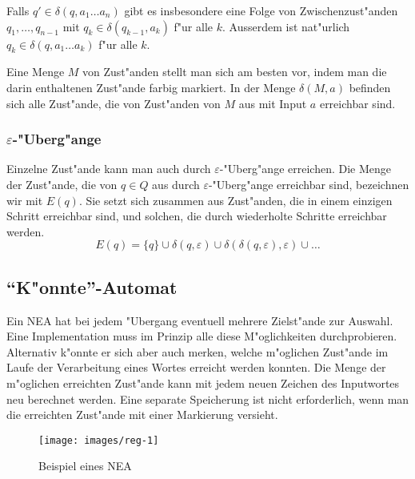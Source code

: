 Falls $q'\in\delta(q,a_1\dots a_n)$ gibt
es insbesondere eine Folge von Zwischenzust"anden $q_1,\dots,q_{n-1}$
mit $q_k\in\delta(q_{k-1},a_k)$ f"ur alle $k$. Ausserdem  ist
nat"urlich $q_k\in\delta(q,a_1\dots a_k)$ f"ur alle $k$.

Eine Menge $M$ von Zust"anden stellt man sich am besten vor, indem man die
darin enthaltenen Zust"ande farbig markiert. In der Menge $\delta(M,a)$
befinden sich alle Zust"ande, die von Zust"anden von $M$ aus mit Input
$a$ erreichbar sind.

\subsubsection{$\varepsilon$-"Uberg"ange}

Einzelne Zust"ande kann man auch durch $\varepsilon$-"Uberg"ange
erreichen. Die Menge der Zust"ande, die von $q\in Q$ aus durch
$\varepsilon$-"Uberg"ange erreichbar sind, bezeichnen wir mit
$E(q)$.
Sie setzt sich zusammen aus Zust"anden, die in einem einzigen 
Schritt erreichbar sind, und solchen, die durch wiederholte
Schritte erreichbar werden. 
\[
E(q)=\{q\} \cup \delta(q,\varepsilon) \cup \delta(\delta(q,\varepsilon),\varepsilon)\cup\dots
\]

\subsection{``K"onnte''-Automat\label{Thompson-NEA}}
Ein NEA hat bei jedem "Ubergang eventuell mehrere Zielst"ande zur Auswahl.
Eine Implementation muss im Prinzip alle diese M"oglichkeiten 
durchprobieren.
Alternativ k"onnte er sich aber auch merken,
welche m"oglichen Zust"ande im Laufe der Verarbeitung eines
Wortes erreicht werden konnten.
Die Menge der m"oglichen erreichten Zust"ande kann mit jedem
neuen Zeichen des Inputwortes neu berechnet werden. 
Eine separate Speicherung ist nicht erforderlich, wenn man die
erreichten Zust"ande mit einer Markierung versieht.

\begin{figure}
\begin{center}
\texttt{[image: images/reg-1]}
\end{center}
\caption{Beispiel eines NEA\label{koenntenea}}
\end{figure}

